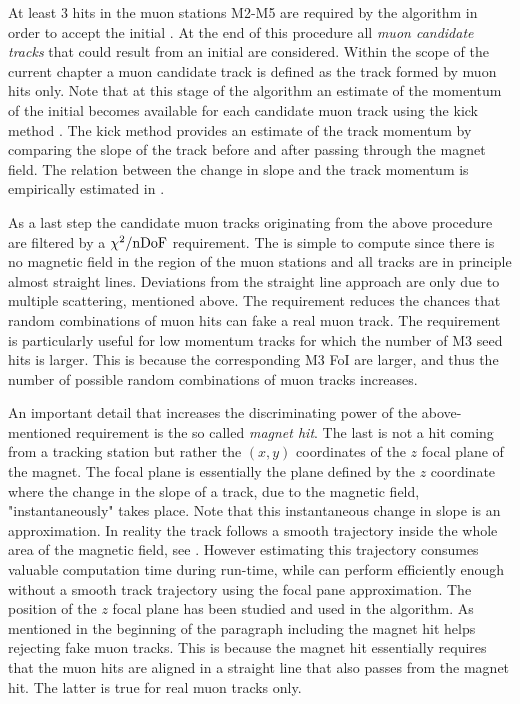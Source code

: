 At least 3 hits in the muon stations M2-M5 are required by the \mvm algorithm in order to accept the initial \veloTrack.
At the end of this procedure all {\it muon candidate tracks} that could result from an initial \veloTrack are considered.
Within the scope of the current chapter a muon candidate track is defined as the track formed by muon hits only.
Note that at this stage of the algorithm an estimate of the momentum of the initial \veloTrack becomes available
for each candidate muon track using the kick method \cite{Hommels:999327}. The kick method provides an estimate
of the track momentum by comparing the slope of the track before and after passing through the \lhcb magnet
field. The relation between the change in slope and the track momentum is empirically estimated in \cite{roelThesis}.

As a last step the candidate muon tracks originating from the above procedure are filtered by a $\chi^2/{\rm nDoF}$
requirement. The \chisq is simple to compute since there is no magnetic field in the region of the muon stations
and all tracks are in principle almost straight lines. Deviations from the straight line approach are only due to
multiple scattering, mentioned above. The \chisq requirement reduces the chances that random combinations of muon hits
can fake a real muon track. The requirement is particularly useful for low momentum tracks for which the number
of M3 seed hits is larger. This is because the corresponding M3 FoI are larger, and thus the number of possible
random combinations of muon tracks increases.

An important detail that increases the discriminating power of the above-mentioned \chisq requirement is the
so called {\it magnet hit}. The last is not a hit coming from a tracking station but rather the $(x,y)$ coordinates
of the $z$ focal plane of the \lhcb magnet. The focal plane is essentially the plane defined by the $z$ coordinate
where the change in the slope of a track, due to the magnetic field,  "instantaneously" takes place. Note that this
instantaneous change in slope is an approximation. In reality the track follows a smooth trajectory inside the whole
area of the magnetic field, see . However estimating this trajectory consumes valuable computation
time during \hltone run-time, while \mvm can perform efficiently enough without a smooth track trajectory using the focal
pane approximation. The position of the $z$ focal plane has been studied \cite{Hommels:999327} and used in the \mvm algorithm.
As mentioned in the beginning of the paragraph including the magnet hit helps rejecting fake muon tracks.
This is because the magnet hit essentially requires that the muon hits are aligned in a straight line that
also passes from the magnet hit. The latter is true for real muon tracks only.


